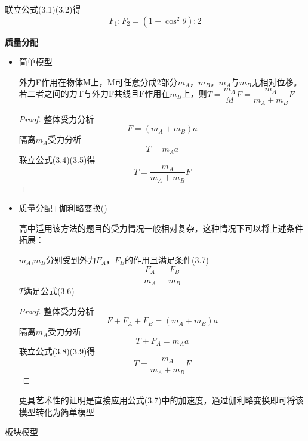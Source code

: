 \begin{problemset}
\begin{example}
\begin{solution}
			联立公式(3.1)(3.2)得
			\begin{equation}
				F_1:F_2=(1+\cos^2\theta):2
			\end{equation}
			
    		\end{solution}
	\end{example}
	\newpage
	\item \textbf{质量分配}
	\begin{itemize}
		\item 简单模型
		\begin{conclusion}
			外力F作用在物体M上，M可任意分成2部分$m_A$，$m_B$。$m_A$与$m_B$无相对位移。若二者之间的力T与外力F共线且F作用在$m_B$上，则$T=\dfrac{m_A}{M}F=\dfrac{m_A}{m_A+m_B}F$
		\begin{proof}
		
			整体受力分析
			\begin{equation}
				F=(m_A+m_B)a
			\end{equation}
			隔离$m_A$受力分析
			\begin{equation}
				T=m_Aa
			\end{equation}
			联立公式(3.4)(3.5)得
			\begin{equation}
				T=\dfrac{m_A}{m_A+m_B}F
			\end{equation}
		\end{proof}
		\end{conclusion}
		\item 质量分配+伽利略变换(\ding{72})
		
		高中适用该方法的题目的受力情况一般相对复杂，这种情况下可以将上述条件拓展：
		\begin{conclusion}
			$m_A$,$m_B$分别受到外力$F_A$，$F_B$的作用且满足条件(3.7)
			\begin{equation}
			\dfrac{F_A}{m_A}=\dfrac{F_B}{m_B}
			\end{equation}
			$T$满足公式(3.6)
		\end{conclusion}

		
		\begin{proof}
			整体受力分析
			\begin{equation}
				F+F_A+F_B=(m_A+m_B)a
			\end{equation}
			隔离$m_A$受力分析
			\begin{equation}
				T+F_A=m_Aa
			\end{equation}
			联立公式(3.8)(3.9)得
			\begin{equation}
				T=\dfrac{m_A}{m_A+m_B}F
			\end{equation}
		\end{proof}
		更具艺术性的证明是直接应用公式(3.7)中的加速度，通过伽利略变换即可将该模型转化为简单模型
	\end{itemize}
	\newpage
	\item 板块模型
	

\end{problemset}
